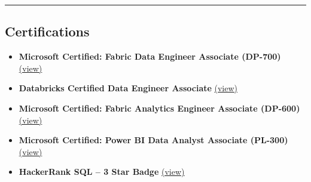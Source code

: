 \documentclass[11pt,letterpaper]{article}
\begin{document}
\hrule
\vspace{-0.8em}





\subsection*{\Large Certifications}

\begin{itemize}[leftmargin=1em,noitemsep]

\item
\textbf{Microsoft Certified: Fabric Data Engineer Associate (DP-700)}
\href{https://learn.microsoft.com/api/credentials/share/en-in/SayanBanerjee-3854/2BD18E16EC520850?sharingId=4A16B92B473CC26C}{(view)}

\item
\textbf{Databricks Certified Data Engineer Associate}
\href{https://credentials.databricks.com/fd8b180d-776d-4bf4-a377-cd97b8e59479}{(view)}

\item
\textbf{Microsoft Certified: Fabric Analytics Engineer Associate (DP-600)}
\href{https://learn.microsoft.com/api/credentials/share/en-in/SayanBanerjee-3854/73189B7510B02DC2?sharingId=4A16B92B473CC26C}{(view)}

\item
\textbf{Microsoft Certified: Power BI Data Analyst Associate (PL-300)}
\href{https://learn.microsoft.com/api/credentials/share/en-us/SayanBanerjee-3854/78F1D0BA46D6F08D?sharingId=4A16B92B473CC26C}{(view)}

\item
\textbf{HackerRank SQL – 3 Star Badge}
\href{https://www.hackerrank.com/profile/sayanbanerjee024}{(view)}

\end{itemize}
\end{document}
